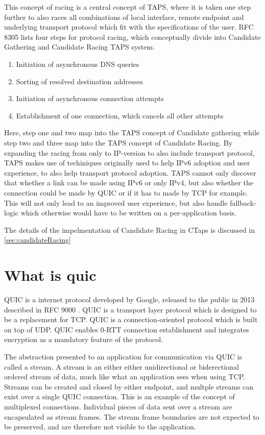 This concept of racing is a central concept of TAPS, where it is
taken one step further to also races all combinations of local interface,
remote endpoint and underlying transport protocol which fit with the
specifications of the user. RFC 8305 lists four steps for protocol racing,
which conceptually divide into Candidate Gathering and Candidate Racing 
TAPS system.

\begin{enumerate}
  \item Initiation of asynchronous DNS queries
  \item Sorting of resolved destination addresses
  \item Initiation of asynchronous connection attempts
  \item Establishment of one connection, which cancels all other attempts
\end{enumerate} \cite{schinaziHappyEyeballsVersion2017}

Here, step one and two map into the TAPS concept of Candidate gathering
while step two and three map into the TAPS concept of Candidate Racing.
By expanding the racing from only to IP-version to also include transport
protocol, TAPS makes use of techiniques originally used to help IPv6
adoption and user experience, to also help transport protocol adoption.
TAPS cannot only discover that whether a link can be made using IPv6
or only IPv4, but also whether the connection could be made by QUIC
or if it has to made by TCP for example. This will not only lead to
an improved user experience, but also handle fallback-logic which otherwise
would have to be written on a per-application basis.

The details of the impelmentation of Candidate Racing in CTaps
is discussed in \cref{sec:candidateRacing}


\section{What is quic}

QUIC is a internet protocol developed by Google, released to the
public in 2013 described in RFC 9000
\cite{iyengarQUICUDPBasedMultiplexed2021}. QUIC is a transport
layer protocol which is designed to be a replacement for TCP.
QUIC is a connection-oriented protocol which is built on top of
UDP. QUIC enables 0-RTT connection establishment and integrates
encryption as a mandatory feature of the protocol.

The abstraction presented to an application for communication
via QUIC is called a stream. A stream is an either either
unidirectional or biderectional ordered stream of data, much
like what an application sees when using TCP. Streams can be created and
closed by either endpoint, and multple streams can exist over a
single QUIC connection. This is an example of the concept of
multiplexed connections. Individual pieces of data sent over a
stream are encapsulated as stream frames. The stream frame boundaries
are not expected to be preserved, and are therefore not visible
to the application.

